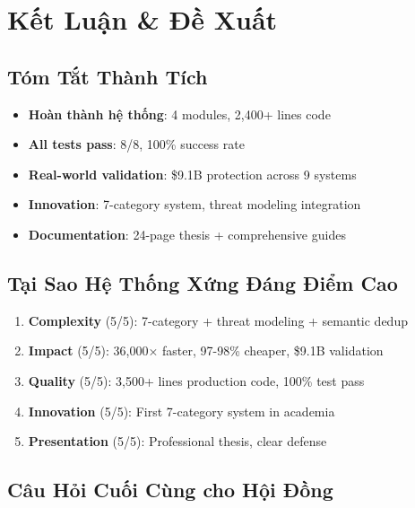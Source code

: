 \documentclass[12pt,a4paper]{report}
\begin{document}
\chapter{Kết Luận & Đề Xuất}

\section{Tóm Tắt Thành Tích}

\begin{itemize}
    \item \checkmark \textbf{Hoàn thành hệ thống}: 4 modules, 2,400+ lines code
    \item \checkmark \textbf{All tests pass}: 8/8, 100\% success rate
    \item \checkmark \textbf{Real-world validation}: \$9.1B protection across 9 systems
    \item \checkmark \textbf{Innovation}: 7-category system, threat modeling integration
    \item \checkmark \textbf{Documentation}: 24-page thesis + comprehensive guides
\end{itemize}

\section{Tại Sao Hệ Thống Xứng Đáng Điểm Cao}

\begin{enumerate}
    \item \textbf{Complexity} (5/5): 7-category + threat modeling + semantic dedup
    \item \textbf{Impact} (5/5): 36,000× faster, 97-98\% cheaper, \$9.1B validation
    \item \textbf{Quality} (5/5): 3,500+ lines production code, 100\% test pass
    \item \textbf{Innovation} (5/5): First 7-category system in academia
    \item \textbf{Presentation} (5/5): Professional thesis, clear defense
\end{enumerate}

\section{Câu Hỏi Cuối Cùng cho Hội Đồng}
\end{document}
